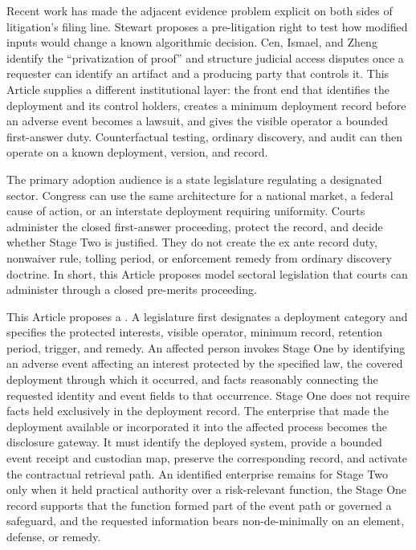 Recent work has made the adjacent evidence problem explicit on both sides of litigation's filing line. Stewart proposes a pre-litigation right to test how modified inputs would change a known algorithmic decision. Cen, Ismael, and Zheng identify the ``privatization of proof'' and structure judicial access disputes once a requester can identify an artifact and a producing party that controls it. This Article supplies a different institutional layer: the front end that identifies the deployment and its control holders, creates a minimum deployment record before an adverse event becomes a lawsuit, and gives the visible operator a bounded first-answer duty. Counterfactual testing, ordinary discovery, and audit can then operate on a known deployment, version, and record.

The primary adoption audience is a state legislature regulating a designated sector. Congress can use the same architecture for a national market, a federal cause of action, or an interstate deployment requiring uniformity. Courts administer the closed first-answer proceeding, protect the record, and decide whether Stage Two is justified. They do not create the ex ante record duty, nonwaiver rule, tolling period, or enforcement remedy from ordinary discovery doctrine. In short, this Article proposes model sectoral legislation that courts can administer through a closed pre-merits proceeding.

This Article proposes a . A legislature first designates a deployment category and specifies the protected interests, visible operator, minimum record, retention period, trigger, and remedy. An affected person invokes Stage One by identifying an adverse event affecting an interest protected by the specified law, the covered deployment through which it occurred, and facts reasonably connecting the requested identity and event fields to that occurrence. Stage One does not require facts held exclusively in the deployment record. The enterprise that made the deployment available or incorporated it into the affected process becomes the disclosure gateway. It must identify the deployed system, provide a bounded event receipt and custodian map, preserve the corresponding record, and activate the contractual retrieval path. An identified enterprise remains for Stage Two only when it held practical authority over a risk-relevant function, the Stage One record supports that the function formed part of the event path or governed a safeguard, and the requested information bears non-de-minimally on an element, defense, or remedy.

